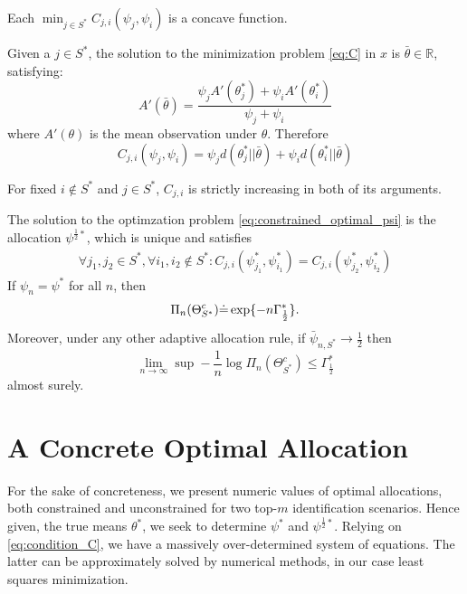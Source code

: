 \begin{lemma}\label{lemma:C_concave}
  Each $\min_{j \in S^*} C_{j, i}(\psi_j, \psi_i)$ is a concave function.
\end{lemma}

\begin{lemma}\label{lemma:C_unique_solution}
  Given a $j \in S^*$, the solution to the minimization problem \eqref{eq:C} in $x$ is $\bar{\theta} \in \mathbb{R}$, satisfying:
  \[A'(\bar{\theta}) = \frac{\psi_j A'(\theta_j^*) + \psi_i A'(\theta_i^*)}{\psi_j + \psi_i}\]
  where $A'(\theta)$ is the mean observation under $\theta$. Therefore
  \[C_{j, i}(\psi_j, \psi_i) = \psi_j d(\theta^*_j || \bar{\theta}) + \psi_i d(\theta^*_i || \bar{\theta})\]
\end{lemma}

\begin{lemma}\label{lemma:C_strictly_increasing}
  For fixed $i \notin S^*$ and $j \in S^*$, $C_{j, i}$ is strictly increasing in both of its arguments.
\end{lemma}

\begin{proposition}\label{proposition:characterization}
  The solution to the optimzation problem \ref{eq:constrained_optimal_psi} is the allocation $\psi^{\frac{1}{2}*}$, which is unique and satisfies
  \begin{align}
    \forall j_1, j_2 \in S^*, \forall i_1, i_2 \notin S^*: C_{j, i}(\psi^*_{j_1}, \psi^*_{i_1}) = C_{j, i}(\psi^*_{j_2}, \psi^*_{i_2})\label{eq:condition_C}
  \end{align}
  If $\psi_n = \psi^*$ for all $n$, then
  \[\Pi_n(\Theta_{S^*}^c) \dot{=} \exp \{-n\Gamma^*_{\frac{1}{2}}\}.\]
  Moreover, under any other adaptive allocation rule, if $\bar{\psi}_{n, S^*} \rightarrow \frac{1}{2}$ then
  \[\lim_{n \rightarrow \infty} \sup - \frac{1}{n} \log \Pi_n(\Theta^c_{S^*}) \leq \Gamma^*_{\frac{1}{2}}\]
  almost surely.
\end{proposition}

\section{A Concrete Optimal Allocation}\label{section:conrete_optimal_allocation}
For the sake of concreteness, we present numeric values of optimal allocations, both constrained and unconstrained for two top-$m$ identification scenarios.
Hence given, the true means $\theta^*$, we seek to determine $\psi^*$ and $\psi^{\frac{1}{2}*}$. Relying on \eqref{eq:condition_C}, we have a massively over-determined system of equations. The latter can be approximately solved by numerical methods, in our case least squares minimization.

